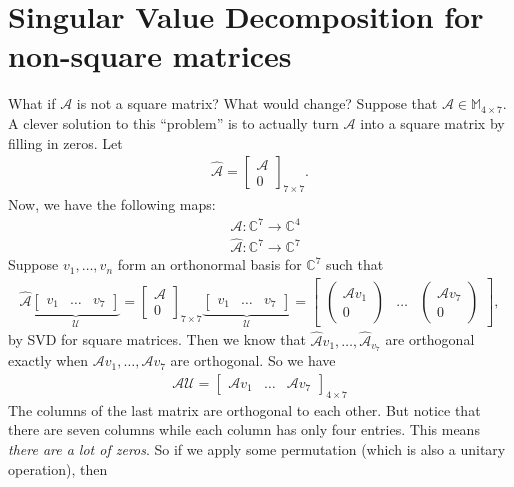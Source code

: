 \documentclass{book}
\theoremstyle{definition}
\newcommand{\C}{\mathbb{C}}
\newcommand{\Uni}{\mathcal{U}}
\newcommand{\A}{\mathcal{A}}
\begin{document}
\section{Singular Value Decomposition for non-square matrices}
What if $\A$ is not a square matrix? What would change? Suppose that $\A \in \mathbb{M}_{4\times 7}$. A clever solution to this ``problem'' is to actually turn $\A$ into a square matrix by filling in zeros. Let 
\begin{align*}
\hat{\A} = \begin{bmatrix}
\A \\ 0
\end{bmatrix}_{7\times 7}.
\end{align*}
Now, we have the following maps:
\begin{align}
&\A : \C^7 \to \C^4\\
&\hat{\A} : \C^7 \to \C^7
\end{align}
Suppose $v_1, \dots, v_n$ form an orthonormal basis for $\C^7$ such that 
\begin{align*}
\hat{\A}\underbrace{\begin{bmatrix}
v_1 & \dots & v_7
\end{bmatrix}}_{\Uni} = \begin{bmatrix}
\A \\ 0
\end{bmatrix}_{7\times 7}
\underbrace{\begin{bmatrix}
v_1 & \dots & v_7
\end{bmatrix}}_{\Uni}
= \begin{bmatrix}
\begin{pmatrix}
\A v_1 \\ 0
\end{pmatrix} & \dots & \begin{pmatrix}
\A v_7 \\ 0
\end{pmatrix}
\end{bmatrix},
\end{align*}
by SVD for square matrices. Then we know that $\hat{\A}{v_1},\dots,\hat{\A}_{v_7}$ are orthogonal exactly when $\A v_1, \dots, \A v_7$ are orthogonal. So we have
\begin{align*}
\A \Uni = \begin{bmatrix}
\A v_1 & \dots & \A v_7
\end{bmatrix}_{4\times 7}
\end{align*}
The columns of the last matrix are orthogonal to each other. But notice that there are seven columns while each column has only four entries. This means \textit{there are a lot of zeros}. So if we apply some permutation (which is also a unitary operation), then 
\end{document}
